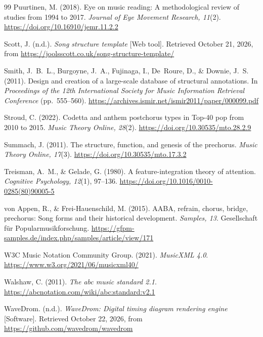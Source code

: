 \documentclass[10pt,twocolumn,a4paper]{article}
\begin{document}
\begin{thebibliography}{99}
Puurtinen, M. (2018). Eye on music reading: A methodological review of studies from
1994 to 2017. \emph{Journal of Eye Movement Research, 11}(2).
\url{https://doi.org/10.16910/jemr.11.2.2}

Scott, J. (n.d.). \emph{Song structure template} [Web tool]. Retrieved October 21,
2026, from \url{https://joolsscott.co.uk/song-structure-template/}

Smith, J.~B.~L., Burgoyne, J.~A., Fujinaga, I., De~Roure, D., \& Downie, J.~S.
(2011). Design and creation of a large-scale database of structural annotations. In
\emph{Proceedings of the 12th International Society for Music Information Retrieval
Conference} (pp.~555--560).
\url{https://archives.ismir.net/ismir2011/paper/000099.pdf}

Stroud, C. (2022). Codetta and anthem postchorus types in Top-40 pop from 2010 to 2015.
\emph{Music Theory Online, 28}(2). \url{https://doi.org/10.30535/mto.28.2.9}

Summach, J. (2011). The structure, function, and genesis of the prechorus. \emph{Music
Theory Online, 17}(3). \url{https://doi.org/10.30535/mto.17.3.2}

Treisman, A.~M., \& Gelade, G. (1980). A feature-integration theory of attention.
\emph{Cognitive Psychology, 12}(1), 97--136.
\url{https://doi.org/10.1016/0010-0285(80)90005-5}

von Appen, R., \& Frei-Hauenschild, M. (2015). AABA, refrain, chorus, bridge,
prechorus: Song forms and their historical development. \emph{Samples, 13}. Gesellschaft
f\"ur Popularmusikforschung. \url{https://gfpm-samples.de/index.php/samples/article/view/171}

W3C Music Notation Community Group. (2021). \emph{MusicXML 4.0}.
\url{https://www.w3.org/2021/06/musicxml40/}

Walshaw, C. (2011). \emph{The abc music standard 2.1}.
\url{https://abcnotation.com/wiki/abc:standard:v2.1}

WaveDrom. (n.d.). \emph{WaveDrom: Digital timing diagram rendering engine} [Software].
Retrieved October 22, 2026, from \url{https://github.com/wavedrom/wavedrom}


\end{thebibliography}
\end{document}
